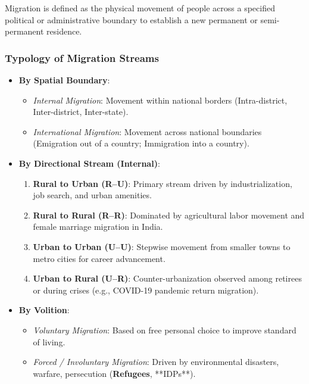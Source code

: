 \documentclass[11pt,a4paper]{article}
\begin{document}
\begin{defbox}[Migration]
Migration is defined as the physical movement of people across a specified political or administrative boundary to establish a new permanent or semi-permanent residence.
\end{defbox}

\subsubsection{Typology of Migration Streams}
\begin{itemize}[leftmargin=*]
  \item \textbf{By Spatial Boundary}:
  \begin{itemize}
    \item \textit{Internal Migration}: Movement within national borders (Intra-district, Inter-district, Inter-state).
    \item \textit{International Migration}: Movement across national boundaries (Emigration out of a country; Immigration into a country).
  \end{itemize}
  
  \item \textbf{By Directional Stream (Internal)}:
  \begin{enumerate}
    \item \textbf{Rural to Urban (R--U)}: Primary stream driven by industrialization, job search, and urban amenities.
    \item \textbf{Rural to Rural (R--R)}: Dominated by agricultural labor movement and female marriage migration in India.
    \item \textbf{Urban to Urban (U--U)}: Stepwise movement from smaller towns to metro cities for career advancement.
    \item \textbf{Urban to Rural (U--R)}: Counter-urbanization observed among retirees or during crises (e.g., COVID-19 pandemic return migration).
  \end{enumerate}

  \item \textbf{By Volition}:
  \begin{itemize}
    \item \textit{Voluntary Migration}: Based on free personal choice to improve standard of living.
    \item \textit{Forced / Involuntary Migration}: Driven by environmental disasters, warfare, persecution (\textbf{Refugees}, **IDPs**).
  \end{itemize}
\end{itemize}
\end{document}
